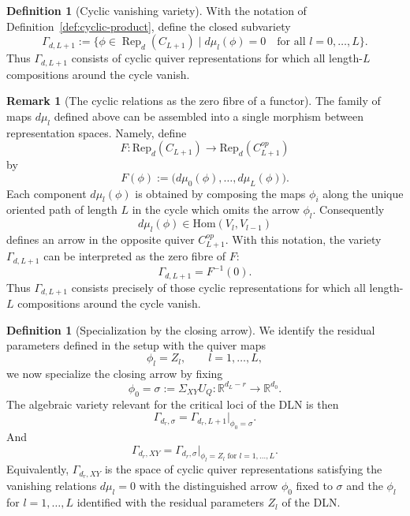 \documentclass{article}
\newcommand{\Rep}{\operatorname{Rep}}
\theoremstyle{definition}
\newtheorem{definition}[theorem]{Definition}
\newtheorem{remark}[theorem]{Remark}
\begin{document}
\begin{definition}[Cyclic vanishing variety]\label{def:Gamma-cyclic}
With the notation of Definition~\ref{def:cyclic-product}, define the closed subvariety
\[
\Gamma_{d,L+1}
:=
\Big\{
\phi\in\Rep_d(C_{L+1})
\;\Big|\;
d\mu_l(\phi)=0
\quad\text{for all }l=0,\ldots,L
\Big\}.
\]
Thus $\Gamma_{d,L+1}$ consists of cyclic quiver representations for which all
length-$L$ compositions around the cycle vanish.
\end{definition}
\begin{remark}[The cyclic relations as the zero fibre of a functor]\label{rem:mu-functor}
The family of maps $d\mu_l$ defined above can be assembled into a single morphism between representation spaces. Namely, define
\[
F : \mathrm{Rep}_d(C_{L+1}) \longrightarrow \mathrm{Rep}_d(C_{L+1}^{op})
\]
by
\[
F(\phi) := \big(d\mu_0(\phi),\ldots,d\mu_L(\phi)\big).
\]
\noindent
Each component $d\mu_l(\phi)$ is obtained by composing the maps $\phi_i$ along the unique oriented path of length $L$ in the cycle which omits the arrow $\phi_l$. Consequently
\[
d\mu_l(\phi)\in\mathrm{Hom}(V_l,V_{l-1})
\]
defines an arrow in the opposite quiver $C_{L+1}^{op}$.
\noindent
With this notation, the variety $\Gamma_{d,L+1}$ can be interpreted as the zero fibre of $F$:
\[
\Gamma_{d,L+1} = F^{-1}(0).
\]
Thus $\Gamma_{d,L+1}$ consists precisely of those cyclic representations for which all length-$L$ compositions around the cycle vanish.
\end{remark}
\begin{definition}[Specialization by the closing arrow]\label{def:Gamma-sigma}
We identify the residual parameters defined in the setup with the quiver maps
\[
\phi_l = Z_l, \qquad l=1,\ldots,L,
\]
we now specialize the closing arrow by fixing
\[
\phi_0 = \sigma := \Sigma_{XY}U_Q : \mathbb{R}^{d_L -r} \to \mathbb{R}^{d_0} .
\]
\noindent
The algebraic variety relevant for the critical loci of the DLN is then
\[
\Gamma_{d_r,\sigma}=
\Gamma_{d_r,L+1}\big|_{\phi_0=\sigma}.
\]
And 
\[
\Gamma_{d_r,XY}=
\Gamma_{d_r,\sigma}\big|_{\phi_l=Z_l \text{ for } l=1,\ldots,L}.
\]
\noindent
Equivalently, $\Gamma_{d_r,XY}$ is the space of cyclic quiver representations
satisfying the vanishing relations $d\mu_l=0$ with the distinguished arrow
$\phi_0$ fixed to $\sigma$ and the $\phi_l$ for $l=1,\ldots,L$ identified with the residual parameters $Z_l$ of the DLN.
\end{definition}
\end{document}
